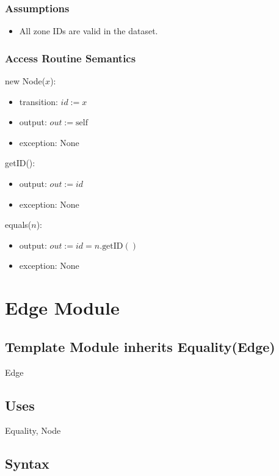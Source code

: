 \documentclass[12pt]{article}
\begin{document}
\subsubsection* {Assumptions}

\begin{itemize}
	\item All zone IDs are valid in the dataset.
\end{itemize}

\subsubsection*{Access Routine Semantics}

\noindent new Node($x$):
\begin{itemize}
	\item transition: $\textit{id} := x$
	\item output: $out := \mbox{self}$
	\item exception: None
\end{itemize}

\noindent getID():
\begin{itemize}
	\item output: $out := \textit{id}$
	\item exception: None
\end{itemize}

\noindent equals($n$):
\begin{itemize}
	\item output: $out := \textit{id} = n.\mbox{getID}()$
	\item exception: None
\end{itemize}

\newpage

\section{Edge Module}

\subsection*{Template Module inherits Equality(Edge)}

Edge

\subsection*{Uses}

Equality, Node

\subsection*{Syntax}
\end{document}
